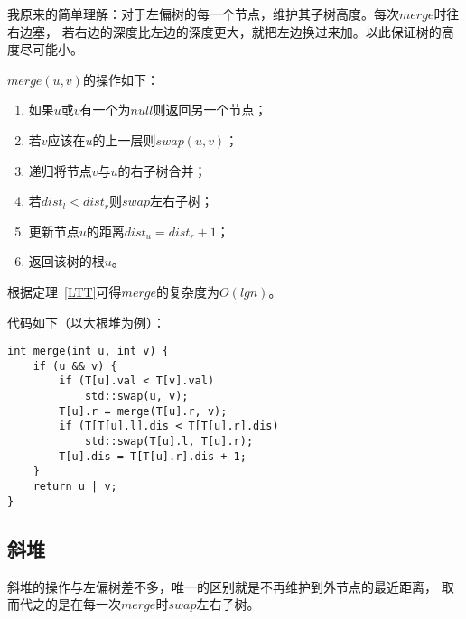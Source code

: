 我原来的简单理解：对于左偏树的每一个节点，维护其子树高度。每次$merge$时往右边塞，
若右边的深度比左边的深度更大，就把左边换过来加。以此保证树的高度尽可能小。

$merge(u,v)$的操作如下：

\begin{enumerate}
    \item 如果$u$或$v$有一个为$null$则返回另一个节点；
    \item 若$v$应该在$u$的上一层则$swap(u,v)$；
    \item 递归将节点$v$与$u$的右子树合并；
    \item 若$dist_l<dist_r$则$swap$左右子树；
    \item 更新节点$u$的距离$dist_u=dist_r+1$；
    \item 返回该树的根$u$。
\end{enumerate}

根据定理~\ref{LTT}可得$merge$的复杂度为$O(lgn)$。

代码如下（以大根堆为例）：

\begin{lstlisting}[title=merge]
int merge(int u, int v) {
    if (u && v) {
        if (T[u].val < T[v].val)
            std::swap(u, v);
        T[u].r = merge(T[u].r, v);
        if (T[T[u].l].dis < T[T[u].r].dis)
            std::swap(T[u].l, T[u].r);
        T[u].dis = T[T[u].r].dis + 1;
    }
    return u | v;
}
\end{lstlisting}

\subsection{斜堆}
斜堆的操作与左偏树差不多，唯一的区别就是不再维护到外节点的最近距离，
取而代之的是在每一次$merge$时$swap$左右子树。
